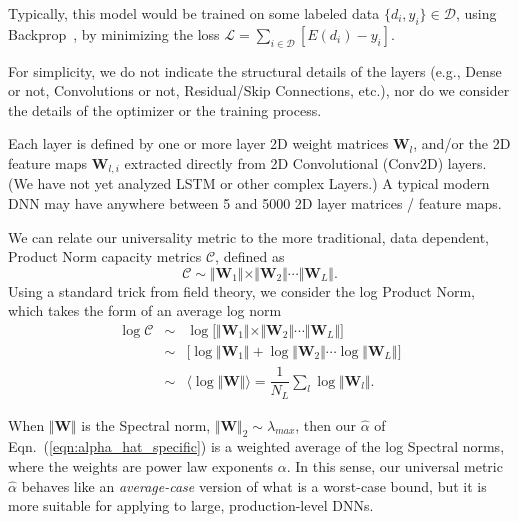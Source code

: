 Typically, this model would be trained on some labeled data $\{d_{i},y_{i}\}\in\mathcal{D}$, using Backprop~\cite{LBOM12_tricks}, by minimizing the loss $\mathcal{L}=\sum_{i\in\mathcal{D}}[E(d_{i})-y_{i}]$.

For simplicity, we do not indicate the structural details of the layers (e.g., Dense or not, Convolutions or not, Residual/Skip Connections, etc.), nor do we consider the details of the optimizer or the training process.

Each layer is defined by one or more layer 2D weight matrices $\mathbf{W}_{l}$, and/or the 2D feature maps $\mathbf{W}_{l,i}$ extracted directly from 2D Convolutional (Conv2D) layers.
(We have not yet analyzed LSTM or other complex Layers.)   A typical modern DNN may have anywhere between 5 and 5000 2D layer matrices / feature maps.

We can relate our universality metric to the more traditional, data dependent,  Product Norm capacity metrics $\mathcal{C}$, defined as
\begin{equation}
\mathcal{C}\sim\Vert\mathbf{W}_{1}\Vert\times\Vert\mathbf{W}_{2}\Vert\cdots\Vert\mathbf{W}_{L}\Vert   .
\end{equation}
Using a standard trick from field theory, we consider the log Product Norm, which takes the form of an average log norm
\begin{eqnarray*}
\log\mathcal{C} &\sim& \log\bigg[\Vert\mathbf{W}_{1}\Vert\times\Vert\mathbf{W}_{2}\Vert\cdots\Vert\mathbf{W}_{L}\Vert\bigg]  \\
                &\sim& \bigg[\log\Vert\mathbf{W}_{1}\Vert+\log\Vert\mathbf{W}_{2}\Vert\cdots\log\Vert\mathbf{W}_{L}\Vert\bigg]  \\
                &\sim&  \langle\log\Vert\mathbf{W}\Vert\rangle=\dfrac{1}{N_{L}}\sum_{l}\log\Vert\mathbf{W}_{l}\Vert   .
\end{eqnarray*}


When $\Vert\mathbf{W}\Vert$ is the Spectral norm, $\Vert\mathbf{W}\Vert_{2}\sim\lambda_{max}$, then our $\hat{\alpha}$ of Eqn.~(\ref{eqn:alpha_hat_specific}) is a weighted average of the log Spectral norms, where the weights are power law exponents $\alpha$. 
In this sense, our universal metric $\hat{\alpha}$ behaves like an \emph{average-case} version of what is a worst-case bound, but it is more suitable for applying to large, production-level DNNs.
 
